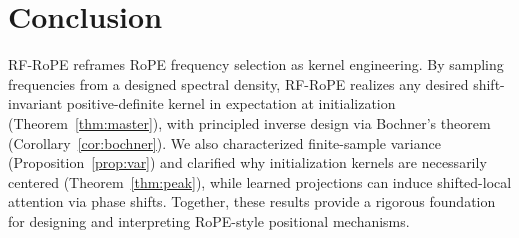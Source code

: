 \documentclass{article}
\theoremstyle{plain}
\theoremstyle{remark}
\begin{document}
\section{Conclusion}
RF-RoPE reframes RoPE frequency selection as kernel engineering. By sampling frequencies from a designed spectral density, RF-RoPE realizes any desired shift-invariant positive-definite kernel in expectation at initialization (Theorem~\ref{thm:master}), with principled inverse design via Bochner's theorem (Corollary~\ref{cor:bochner}). We also characterized finite-sample variance (Proposition~\ref{prop:var}) and clarified why initialization kernels are necessarily centered (Theorem~\ref{thm:peak}), while learned projections can induce shifted-local attention via phase shifts. Together, these results provide a rigorous foundation for designing and interpreting RoPE-style positional mechanisms.



\end{document}

